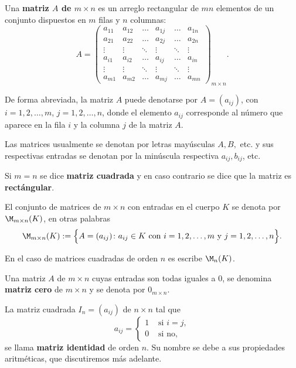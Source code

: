 \begin{defin}
Una \textbf{matriz $A$ de $m \times n$} es un arreglo rectangular de $mn$ elementos de un conjunto dispuestos en $m$ filas y $n$ columnas:
\[A=\left(\begin{array}{cccccc}
     a_{11}& a_{12} & \dots & a_{1j} &\dots & a_{1n}\\
     a_{21}& a_{22} & \dots &a_{2j} &\dots & a_{2n}\\
     \vdots&  \vdots & \ddots &  \vdots &\ddots &  \vdots\\
     a_{i1}& a_{i2} & \dots &a_{ij} &\dots & a_{in}\\
     \vdots&  \vdots & \ddots & \vdots &\ddots &  \vdots\\
     a_{m1}& a_{m2} & \dots & a_{mj} &\dots & a_{mn}
\end{array}\right)_{m\times n}.\]





De forma abreviada, la matriz $A$ puede denotarse por $A=(a_{ij})$, con $i=1,2,\dots, m$, $j=1,2,\dots, n$, donde el elemento $a_{ij}$ corresponde al número que aparece en la fila $i$ y la columna $j$ de la matriz $A$.

Las matrices usualmente se denotan por letras mayúsculas $A, B,$ etc. y sus respectivas entradas se denotan por la minúscula respectiva $a_{ij}, b_{ij}$, etc.

Si $m =n$ se dice \textbf{matriz cuadrada} y en caso contrario se dice que la matriz es \textbf{rect\'angular}.

El conjunto de matrices de $m\times n$ con entradas en el cuerpo $K$ se denota por $\M_{m\times n}(K)$, en otras palabras
\[\M_{m\times n}(K):=\Big\{A=(a_{ij}) \colon a_{ij}\in K \text{ con $i=1,2,\dots, m$ y $j=1,2,\dots, n$}\Big\}.\]
\end{defin}
En el caso de matrices cuadradas de orden $n$ es escribe $\M_n(K)$.


Una matriz $A$ de $m \times n$ cuyas entradas son todas  iguales a 0, se denomina \textbf{matriz cero} de $m \times n$ y se denota por $0_{m\times n}$.

La matriz cuadrada $I_n=(a_{ij})$ de $n\times n$ tal que 
\[a_{ij}=\left\{\begin{array}{ll}
    1 & \text{ si } i= j, \\
   0 & \text{ si no},
\end{array}\right.\]
se llama \textbf{matriz identidad} de orden $n$. Su nombre se debe a sus propiedades aritm\'eticas, que discutiremos m\'as adelante.

